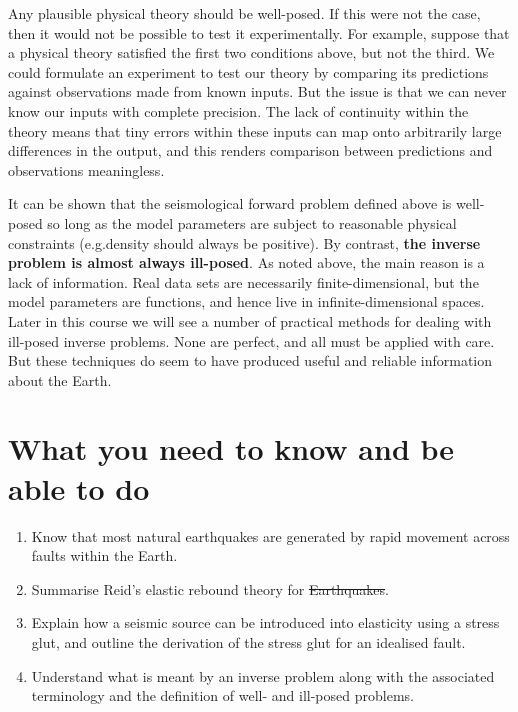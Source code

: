 \documentclass [a4paper,12pt]{paper}
\providecommand{\DIFadd}[1]{{\protect\color{blue}\uwave{#1}}} %
\providecommand{\DIFdel}[1]{{\protect\color{red}\sout{#1}}}                      %
\providecommand{\DIFaddbegin}{} %
\providecommand{\DIFaddend}{} %
\providecommand{\DIFdelbegin}{} %
\providecommand{\DIFdelend}{} %
\begin{document}
Any plausible physical theory should be well-posed. If this were not the case, then it would not be possible to test it experimentally. 
For example, suppose that a physical theory satisfied the first two conditions above, 
but not the third. We could formulate an experiment to test our theory by comparing its predictions against observations made from 
known inputs. But the issue is that we can never know our inputs with complete precision. 
The lack of continuity within the theory means that tiny errors within these inputs can map onto 
arbitrarily large differences in the output, and this renders comparison between predictions and observations meaningless.

It can be shown that the seismological forward problem defined above is well-posed so long as the model parameters are subject to 
reasonable physical constraints (e.g.\DIFaddbegin \DIFadd{\ }\DIFaddend density should always be positive). By contrast, \textbf{the inverse problem is 
almost always ill-posed}. As noted above, the main reason is a lack of information. Real data sets are necessarily finite-dimensional,
but the model parameters are functions, and hence live in infinite-dimensional spaces. Later in this course 
we will see a number of practical methods for dealing with ill-posed inverse problems. None are perfect, and 
all must be applied with care. But these techniques do seem to have produced useful and reliable information about the Earth.

\section*{What you need to know and be able to do}
\DIFdelbegin %
\DIFdelend \DIFaddbegin \begin{enumerate}
    \DIFaddend \item[(i)] Know that most natural earthquakes are generated by rapid movement across faults within the Earth.
    \item[(ii)] Summarise Reid's elastic rebound theory for \DIFdelbegin \DIFdel{Earthquakes}\DIFdelend \DIFaddbegin \DIFadd{earthquakes}\DIFaddend .
    \item[(iii)] Explain how a seismic source can be introduced into elasticity using a stress glut, and outline the derivation of the stress glut for an idealised fault.
    \item[(iv)] Understand what is meant by an inverse problem along with the associated terminology and the definition of well- and ill-posed problems.
\DIFdelbegin %
\DIFdelend \DIFaddbegin \end{enumerate}
\DIFaddend 
\end{document}
